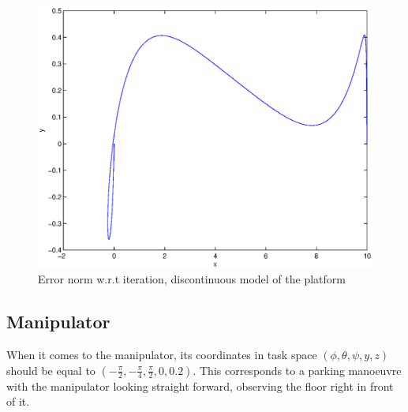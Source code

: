 \begin{figure}[htp]
\centering
\includegraphics[height=0.3\textheight]{img/final_15_1_10_path.eps} %
\caption{Error norm w.r.t iteration, discontinuous model of the platform}
\label{fig:error_discont}
\end{figure}

\subsection{Manipulator}

When it comes to the manipulator,
its coordinates in task space $(\phi, \theta, \psi, y, z) $ should be equal to
$(-\frac{\pi}{2}, -\frac{\pi}{4}, \frac{\pi}{2}, 0, 0.2)$.
This corresponds to a parking manoeuvre with the manipulator
looking straight forward, observing the floor right in front of it.
